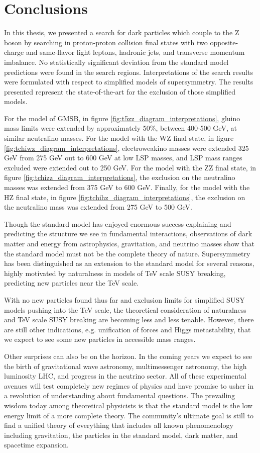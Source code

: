 \chapter{Conclusions}
In this thesis, we presented a search for dark particles which couple to the Z boson by searching in proton-proton collision final states with two opposite-charge and same-flavor light leptons, hadronic jets, and transverse momentum imbalance. No statistically significant deviation from the standard model predictions were found in the search regions. Interpretations of the search results were formulated with respect to simplified models of supersymmetry. The results presented represent the state-of-the-art for the exclusion of those simplified models.

For the model of GMSB, in figure \ref{fig:t5zz_diagram_interpretations}, gluino mass limits were extended by approximately 50\%, between 400-500 GeV, at similar neutralino masses. For the model with the WZ final state, in figure \ref{fig:tchiwz_diagram_interpretations}, electroweakino masses were extended 325 GeV from 275 GeV out to 600 GeV at low LSP masses, and LSP mass ranges excluded were extended out to 250 GeV. For the model with the ZZ final state, in figure \ref{fig:tchizz_diagram_interpretations}, the exclusion on the neutralino masses was extended from 375 GeV to 600 GeV. Finally, for the model with the HZ final state, in figure \ref{fig:tchihz_diagram_interpretations}, the exclusion on the neutralino mass was extended from 275 GeV to 500 GeV.

Though the standard model has enjoyed enormous success explaining and predicting the structure we see in fundamental interactions, observations of dark matter and energy from astrophysics, gravitation, and neutrino masses show that the standard model must not be the complete theory of nature. Supersymmetry has been distinguished as an extension to the standard model for several reasons, highly motivated by naturalness in models of TeV scale SUSY breaking, predicting new particles near the TeV scale. 

With no new particles found thus far and exclusion limits for simplified SUSY models pushing into the TeV scale, the theoretical consideration of naturalness and TeV scale SUSY breaking are becoming less and less tenable. However, there are still other indications, e.g. unification of forces and Higgs metastability\label{sec:theoretical_issues_with_sm}, that we expect to see some new particles in accessible mass ranges.

Other surprises can also be on the horizon. In the coming years we expect to see the birth of gravitational wave astronomy, multimessenger astronomy, the high luminosity LHC, and progress in the neutrino sector. All of these experimental avenues will test completely new regimes of physics and have promise to usher in a revolution of understanding about fundamental questions. The prevailing wisdom today among theoretical physicists is that the standard model is the low energy limit of a more complete theory. The community's ultimate goal is still to find a unified theory of everything that includes all known phenomenology including gravitation, the particles in the standard model, dark matter, and spacetime expansion. 